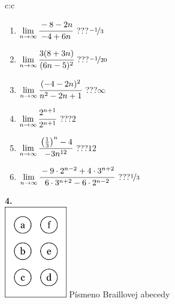 \documentclass[10pt]{report}
\begin{document}
\begin{tabular}{c:c}
\begin{minipage}[c][104.5mm][t]{0.5\linewidth}
\begin{center}
\begin{minipage}{0.79\linewidth}
\begin{center}
\begin{varwidth}{\linewidth}
\begin{enumerate}
\normalsize
\item $\lim\limits_{n\to\infty}\cfrac{-8-2n}{-4+6n}$\quad \dotfill\; ???\;\dotfill \quad $\nicefrac{-1}{3}$
\item $\lim\limits_{n\to\infty}\cfrac{3(8+3n)}{(6n-5)^2}$\quad \dotfill\; ???\;\dotfill \quad $\nicefrac{-1}{20}$
\item $\lim\limits_{n\to\infty}\cfrac{(-4-2n)^2}{n^2-2n+1}$\quad \dotfill\; ???\;\dotfill \quad $\infty$
\item $\lim\limits_{n\to\infty}\cfrac{2^{n+1}}{2^{n+1}}$\quad \dotfill\; ???\;\dotfill \quad $2$
\item $\lim\limits_{n\to\infty}\cfrac{\left(\frac{1}{3}\right)^n -4}{-3n^{12}}$\quad \dotfill\; ???\;\dotfill \quad $12$
\item $\lim\limits_{n\to\infty}\cfrac{-9\cdot 2^{n-2}+4\cdot 3^{n+2}}{6\cdot 3^{n+2}-6\cdot 2^{n-2}}$\quad \dotfill\; ???\;\dotfill \quad $\nicefrac{1}{3}$
\end{enumerate}
\end{varwidth}
\end{center}
\end{minipage}
\begin{minipage}{0.20\linewidth}
\begin{center}
{\Huge\bfseries 4.} \\[2mm]
\includegraphics[height=40mm]{../images/braille.png}
{\small Písmeno Braillovej abecedy}
\end{center}
\end{minipage}
\end{center}
\end{minipage}
%
\end{tabular}
\newpage
\thispagestyle{empty}
\end{document}
